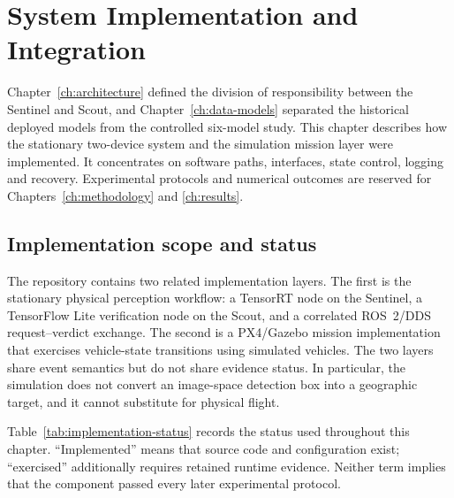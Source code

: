 \chapter{System Implementation and Integration}
\label{ch:implementation}

Chapter~\ref{ch:architecture} defined the division of responsibility between
the Sentinel and Scout, and Chapter~\ref{ch:data-models} separated the
historical deployed models from the controlled six-model study. This chapter
describes how the stationary two-device system and the simulation mission layer
were implemented. It concentrates on software paths, interfaces, state control,
logging and recovery. Experimental protocols and numerical outcomes are
reserved for Chapters~\ref{ch:methodology} and \ref{ch:results}.

\section{Implementation scope and status}
\label{sec:implementation:status}

The repository contains two related implementation layers. The first is the
stationary physical perception workflow: a TensorRT node on the Sentinel, a
TensorFlow Lite verification node on the Scout, and a correlated ROS~2/DDS
request--verdict exchange. The second is a PX4/Gazebo mission implementation
that exercises vehicle-state transitions using simulated vehicles. The two
layers share event semantics but do not share evidence status. In particular,
the simulation does not convert an image-space detection box into a geographic
target, and it cannot substitute for physical flight.

Table~\ref{tab:implementation-status} records the status used throughout this
chapter. ``Implemented'' means that source code and configuration exist;
``exercised'' additionally requires retained runtime evidence. Neither term
implies that the component passed every later experimental protocol.

